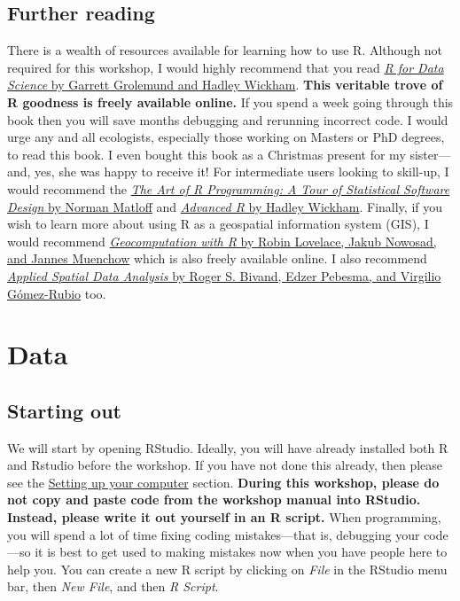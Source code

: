 \documentclass[12pt,]{book}
\begin{document}
\section{Further reading}\label{further-reading}

There is a wealth of resources available for learning how to use R.
Although not required for this workshop, I would highly recommend that
you read \href{https://r4ds.had.co.nz/}{\emph{R for Data Science} by
Garrett Grolemund and Hadley Wickham}. \textbf{This veritable trove of R
goodness is freely available online.} If you spend a week going through
this book then you will save months debugging and rerunning incorrect
code. I would urge any and all ecologists, especially those working on
Masters or PhD degrees, to read this book. I even bought this book as a
Christmas present for my sister---and, yes, she was happy to receive it!
For intermediate users looking to skill-up, I would recommend the
\href{http://shop.oreilly.com/product/9781593273842.do}{\emph{The Art of
R Programming: A Tour of Statistical Software Design} by Norman Matloff}
and \href{https://adv-r.hadley.nz/}{\emph{Advanced R} by Hadley
Wickham}. Finally, if you wish to learn more about using R as a
geospatial information system (GIS), I would recommend
\href{https://geocompr.robinlovelace.net/}{\emph{Geocomputation with R}
by Robin Lovelace, Jakub Nowosad, and Jannes Muenchow} which is also
freely available online. I also recommend
\href{https://www.springer.com/gp/book/9781461476177}{\emph{Applied
Spatial Data Analysis} by Roger S. Bivand, Edzer Pebesma, and Virgilio
Gómez-Rubio} too.

\chapter{Data}\label{data}

\section{Starting out}\label{starting-out}

We will start by opening RStudio. Ideally, you will have already
installed both R and Rstudio before the workshop. If you have not done
this already, then please see the \protect\hyperlink{setup}{Setting up
your computer} section. \textbf{During this workshop, please do not copy
and paste code from the workshop manual into RStudio. Instead, please
write it out yourself in an R script.} When programming, you will spend
a lot of time fixing coding mistakes---that is, debugging your code---so
it is best to get used to making mistakes now when you have people here
to help you. You can create a new R script by clicking on \emph{File} in
the RStudio menu bar, then \emph{New File}, and then \emph{R Script}.
\end{document}

